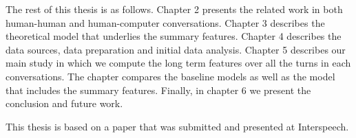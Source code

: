The rest of this thesis is as follows.  Chapter 2 presents the related work in both human-human and human-computer conversations. Chapter 3 describes the theoretical model that underlies the summary features. Chapter 4 describes the data sources, data preparation and initial data analysis. Chapter 5 describes our main study in which we compute the long term features over all the turns in each conversations. The chapter compares the baseline models as well as the model that includes the summary features. Finally, in chapter 6 we present the conclusion and future work.


This thesis is based on a paper \cite{Meshorer2016UsingPS} that was submitted and presented at Interspeech.

